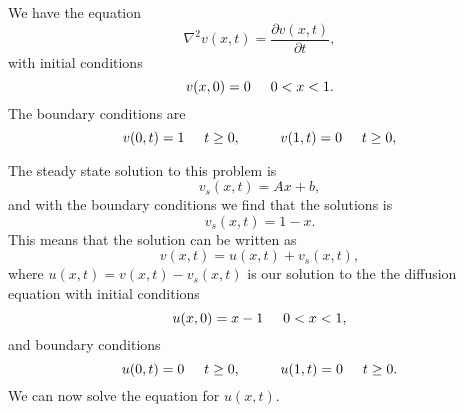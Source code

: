\documentclass{article}
\begin{document}
\maketitle

We have the equation
\[
 \nabla^2 v(x,t) =\frac{\partial v(x,t)}{\partial t},
\] 
with initial conditions 
\[
v(x,0)= 0 \hspace{0.5cm} 0 < x < 1.
\]
The 
boundary conditions are 
\[
v(0,t)= 1 \hspace{0.5cm} t \ge 0,  \hspace{1cm}  v(1,t)= 0 \hspace{0.5cm} t \ge 0,
\]

The steady state solution to this problem is
\[
v_s(x,t) = Ax+b,\]
and with the  boundary conditions we find that the solutions is
\[
v_s(x,t) = 1-x.
\]
This means that the solution can be written as
\[
v(x,t) = u(x,t) + v_s(x,t),
\]
where $u(x,t)=v(x,t)-v_s(x,t)$ is our solution to the the diffusion equation 
with initial conditions 
\[
u(x,0)= x-1 \hspace{0.5cm} 0 < x < 1,
\]
and 
boundary conditions 
\[
u(0,t)= 0 \hspace{0.5cm} t \ge 0,  \hspace{1cm}  u(1,t)= 0 \hspace{0.5cm} t \ge 0.
\]
We can now solve the equation for $u(x,t)$.
\end{document}

